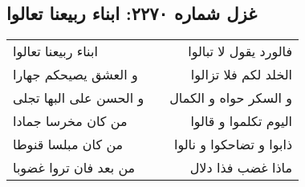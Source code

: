 \begin{center}
\section*{غزل شماره ۲۲۷۰: ابناء ربیعنا تعالوا}
\label{sec:2270}
\begin{longtable}{l p{0.5cm} r}
ابناء ربیعنا تعالوا
&&
فالورد یقول لا تبالوا
\\
و العشق یصیحکم جهارا
&&
الخلد لکم فلا تزالوا
\\
و الحسن علی البها تجلی
&&
و السکر حواه و الکمال
\\
من کان مخرسا جمادا
&&
الیوم تکلموا و قالوا
\\
من کان مبلسا قنوطا
&&
ذابوا و تضاحکوا و نالوا
\\
من بعد فان تروا غضوبا
&&
ماذا غضب فذا دلال
\\
\end{longtable}
\end{center}
